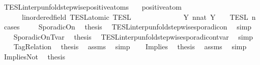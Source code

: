 \begin{isabellebody}
\begin{isamarkuptext}
\end{isamarkuptext}\isamarkuptrue%
\isamarkupfalse%
\ TESL{\isacharunderscore}interp{\isacharunderscore}unfold{\isacharunderscore}stepwise{\isacharunderscore}positive{\isacharunderscore}atoms{\isacharcolon}\isanewline
\ \ \ {\isacartoucheopen}positive{\isacharunderscore}atom\ {\isasymphi}{\isacartoucheclose}\isanewline
\ \ \ \ \ {\isacartoucheopen}{\isasymlbrakk}\ {\isasymphi}{\isacharcolon}{\isacharcolon}{\isacharprime}{\isasymtau}{\isacharcolon}{\isacharcolon}linordered{\isacharunderscore}field\ TESL{\isacharunderscore}atomic\ {\isasymrbrakk}\isactrlsub T\isactrlsub E\isactrlsub S\isactrlsub L\isanewline
\ \ \ \ \ \ \ \ \ \ \ \ {\isacharequal}\ {\isasymUnion}\ {\isacharbraceleft}Y{\isachardot}\ {\isasymexists}n{\isacharcolon}{\isacharcolon}nat{\isachardot}\ Y\ {\isacharequal}\ {\isasymlbrakk}\ {\isasymphi}\ {\isasymrbrakk}\isactrlsub T\isactrlsub E\isactrlsub S\isactrlsub L\isactrlbsup {\isasymge}\ n\isactrlesup {\isacharbraceright}{\isacartoucheclose}\isanewline
%
\isadelimproof
%
\endisadelimproof
%
\isatagproof
{}\isamarkupfalse%
\ {\isacharparenleft}cases\ {\isasymphi}{\isacharparenright}\isanewline
\ \ \isamarkupfalse%
\ SporadicOn\ \isamarkupfalse%
\ {\isacharquery}thesis\ \isamarkupfalse%
\ TESL{\isacharunderscore}interp{\isacharunderscore}unfold{\isacharunderscore}stepwise{\isacharunderscore}sporadicon\ \isamarkupfalse%
\ simp\isanewline
{}\isamarkupfalse%
\isanewline
\ \ \isamarkupfalse%
\ SporadicOnTvar\ \isamarkupfalse%
\ {\isacharquery}thesis\ \isamarkupfalse%
\ TESL{\isacharunderscore}interp{\isacharunderscore}unfold{\isacharunderscore}stepwise{\isacharunderscore}sporadicon{\isacharunderscore}tvar\ \isamarkupfalse%
\ simp\isanewline
{}\isamarkupfalse%
\isanewline
\ \ \isamarkupfalse%
\ TagRelation\ \isamarkupfalse%
\ {\isacharquery}thesis\ \isamarkupfalse%
\ assms\ \isamarkupfalse%
\ simp\isanewline
{}\isamarkupfalse%
\isanewline
\ \ \isamarkupfalse%
\ Implies\ \isamarkupfalse%
\ {\isacharquery}thesis\ \isamarkupfalse%
\ assms\ \isamarkupfalse%
\ simp\isanewline
{}\isamarkupfalse%
\isanewline
\ \ \isamarkupfalse%
\ ImpliesNot\ \isamarkupfalse%
\ {\isacharquery}thesis\ \isamarkupfalse%

\end{isabellebody}
